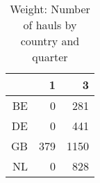 \begin{table}[ht]
\centering
\begin{tabular}{rrr}
  \hline
 & 1 & 3 \\ 
  \hline
BE & 0 & 281 \\ 
  DE & 0 & 441 \\ 
  GB & 379 & 1150 \\ 
  NL & 0 & 828 \\ 
   \hline
\end{tabular}
\caption{Weight: Number of hauls by country and quarter} 
\end{table}
